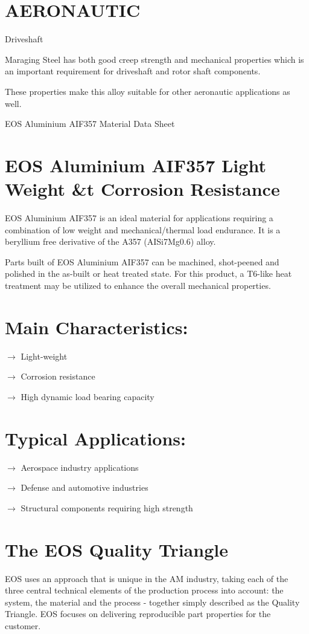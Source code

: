 \documentclass[10pt]{article}
\begin{document}
\section*{AERONAUTIC}
Driveshaft

Maraging Steel has both good creep strength and mechanical properties which is an important requirement for driveshaft and rotor shaft components.

These properties make this alloy suitable for other aeronautic applications as well.

EOS Aluminium AIF357 Material Data Sheet

\section*{EOS Aluminium AIF357 Light Weight \&t Corrosion Resistance}
EOS Aluminium AIF357 is an ideal material for applications requiring a combination of low weight and mechanical/thermal load endurance. It is a beryllium free derivative of the A357 (AISi7Mg0.6) alloy.

Parts built of EOS Aluminium AIF357 can be machined, shot-peened and polished in the as-built or heat treated state. For this product, a T6-like heat treatment may be utilized to enhance the overall mechanical properties.

\section*{Main Characteristics:}
$\longrightarrow$ Light-weight

$\longrightarrow$ Corrosion resistance

$\longrightarrow$ High dynamic load bearing capacity

\section*{Typical Applications:}
$\longrightarrow$ Aerospace industry applications

$\longrightarrow$ Defense and automotive industries

$\longrightarrow$ Structural components requiring high strength

\section*{The EOS Quality Triangle}
EOS uses an approach that is unique in the AM industry, taking each of the three central technical elements of the production process into account: the system, the material and the process - together simply described as the Quality Triangle. EOS focuses on delivering reproducible part properties for the customer.
\end{document}
